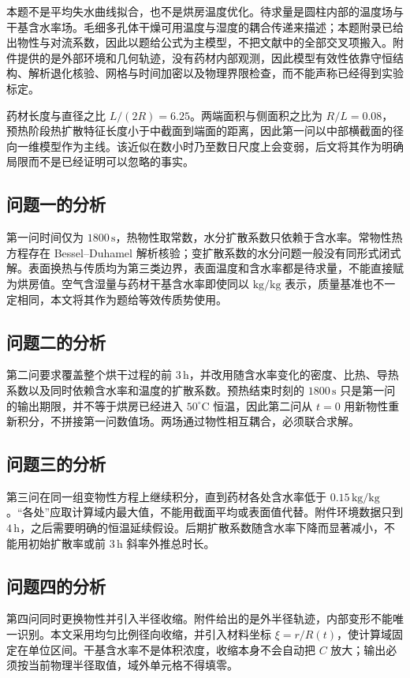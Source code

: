 本题不是平均失水曲线拟合，也不是烘房温度优化。待求量是圆柱内部的温度场与干基含水率场。毛细多孔体干燥可用温度与湿度的耦合传递来描述\cite{luikov1975}；本题附录已给出物性与对流系数，因此以题给公式为主模型，不把文献中的全部交叉项搬入。附件提供的是外部环境和几何轨迹，没有药材内部观测，因此模型有效性依靠守恒结构、解析退化核验、网格与时间加密以及物理界限检查，而不能声称已经得到实验标定。

药材长度与直径之比 $L/(2R)=6.25$。两端面积与侧面积之比为 $R/L=0.08$，预热阶段热扩散特征长度小于中截面到端面的距离，因此第一问以中部横截面的径向一维模型作为主线。该近似在数小时乃至数日尺度上会变弱，后文将其作为明确局限而不是已经证明可以忽略的事实。

\subsection{问题一的分析}

第一问时间仅为 $1800\,\mathrm{s}$，热物性取常数，水分扩散系数只依赖于含水率。常物性热方程存在 Bessel--Duhamel 解析核验；变扩散系数的水分问题一般没有同形式闭式解。表面换热与传质均为第三类边界，表面温度和含水率都是待求量，不能直接赋为烘房值。空气含湿量与药材干基含水率即使同以 $\mathrm{kg/kg}$ 表示，质量基准也不一定相同，本文将其作为题给等效传质势使用。

\subsection{问题二的分析}

第二问要求覆盖整个烘干过程的前 $3\,\mathrm{h}$，并改用随含水率变化的密度、比热、导热系数以及同时依赖含水率和温度的扩散系数。预热结束时刻的 $1800\,\mathrm{s}$ 只是第一问的输出期限，并不等于烘房已经进入 $50^\circ\mathrm{C}$ 恒温，因此第二问从 $t=0$ 用新物性重新积分，不拼接第一问数值场。两场通过物性相互耦合，必须联合求解。

\subsection{问题三的分析}

第三问在同一组变物性方程上继续积分，直到药材各处含水率低于 $0.15\,\mathrm{kg/kg}$。``各处''应取计算域内最大值，不能用截面平均或表面值代替。附件环境数据只到 $4\,\mathrm{h}$，之后需要明确的恒温延续假设。后期扩散系数随含水率下降而显著减小，不能用初始扩散率或前 $3\,\mathrm{h}$ 斜率外推总时长。

\subsection{问题四的分析}

第四问同时更换物性并引入半径收缩。附件给出的是外半径轨迹，内部变形不能唯一识别。本文采用均匀比例径向收缩，并引入材料坐标 $\xi=r/R(t)$，使计算域固定在单位区间。干基含水率不是体积浓度，收缩本身不会自动把 $C$ 放大；输出必须按当前物理半径取值，域外单元格不得填零。
